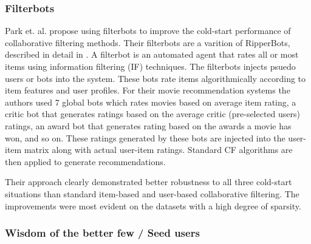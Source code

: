 



\subsubsection{Filterbots}


Park et. al. \cite{Park2006} propose using filterbots to improve the cold-start
performance of collaborative filtering methods. Their filterbots are a varition of RipperBots, described in detail in \cite{Good1999}. A filterbot is an automated agent that rates all or most items using information filtering (IF) techniques. The filterbots injects psuedo
users or bots into the system. These bots rate items algorithmically according to item features and user profiles. For their movie recommendation systems the authors used 7 global bots which rates movies based on average item rating, a critic bot that generates ratings based on the average critic (pre-selected users) ratings, an award bot that generates rating based on the awards a movie has won, and so on. These ratings generated by these bots are injected into the user-item matrix along with actual user-item ratings. Standard CF algorithms are then applied to generate
recommendations.

Their approach clearly demonstrated better robustness to all three cold-start situations than standard item-based
and user-based collaborative filtering. The improvements were most evident on
the datasets with a high degree of sparsity.


\subsubsection{Wisdom of the better few / Seed users}

